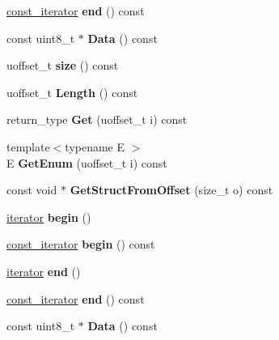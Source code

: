 \begin{DoxyCompactItemize}
\hyperlink{structflatbuffers_1_1VectorIterator}{const\+\_\+iterator} {\bfseries end} () const
\item 
\mbox{\label{classflatbuffers_1_1Vector_aa754e17cb08c36fb8442784c6bc442da}} 
const uint8\+\_\+t $\ast$ {\bfseries Data} () const
\item 
\mbox{\label{classflatbuffers_1_1Vector_a602e093850b2984a95581edc0b47b2f3}} 
uoffset\+\_\+t {\bfseries size} () const
\item 
\mbox{\label{classflatbuffers_1_1Vector_a7ad86e7c749fd750a4e506439a358b06}} 
uoffset\+\_\+t {\bfseries Length} () const
\item 
\mbox{\label{classflatbuffers_1_1Vector_a0c322798bd0cebd2d20b0b0f92de2f9b}} 
return\+\_\+type {\bfseries Get} (uoffset\+\_\+t i) const
\item 
\mbox{\label{classflatbuffers_1_1Vector_a22b4449883dc8e24e87cde27839294c4}} 
{\footnotesize template$<$typename E $>$ }\\E {\bfseries Get\+Enum} (uoffset\+\_\+t i) const
\item 
\mbox{\label{classflatbuffers_1_1Vector_a1dc52eb3974e0484a5421752589d436b}} 
const void $\ast$ {\bfseries Get\+Struct\+From\+Offset} (size\+\_\+t o) const
\item 
\mbox{\label{classflatbuffers_1_1Vector_ac1ab40cdffad6cd50c222fe42c51437b}} 
\hyperlink{structflatbuffers_1_1VectorIterator}{iterator} {\bfseries begin} ()
\item 
\mbox{\label{classflatbuffers_1_1Vector_ac4633f563a5a52980ff0b56fa683a4de}} 
\hyperlink{structflatbuffers_1_1VectorIterator}{const\+\_\+iterator} {\bfseries begin} () const
\item 
\mbox{\label{classflatbuffers_1_1Vector_a53e9c0cb1d27e4bd355034dbd43f0127}} 
\hyperlink{structflatbuffers_1_1VectorIterator}{iterator} {\bfseries end} ()
\item 
\mbox{\label{classflatbuffers_1_1Vector_a9fcfb2e218f49d6d66a8b4a22aa58755}} 
\hyperlink{structflatbuffers_1_1VectorIterator}{const\+\_\+iterator} {\bfseries end} () const
\item 
\mbox{\label{classflatbuffers_1_1Vector_aa754e17cb08c36fb8442784c6bc442da}} 
const uint8\+\_\+t $\ast$ {\bfseries Data} () const
\end{DoxyCompactItemize}
